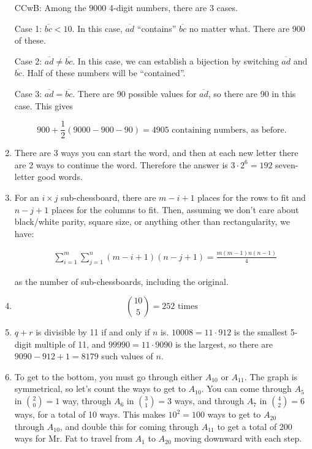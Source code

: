 \documentclass{book}
\numberwithin{equation}{section}
\begin{document}
\begin{enumerate}[label={9.\arabic*}]
CCwB: Among the $9000$ 4-digit numbers, there are 3 cases.

Case 1: $\overline{bc} < 10$. In this case, $\overline{ad}$ ``contains'' $\overline{bc}$ no matter what. There are 900 of these.

Case 2: $\overline{ad} \neq \overline{bc}$. In this case, we can establish a bijection by switching
$\overline{ad}$ and $\overline{bc}$. Half of these numbers will be ``contained''.

Case 3: $\overline{ad} = \overline{bc}$. There are 90 possible values for $\overline{ad}$, so there are 90 in this case. This gives

$$900 + \frac{1}{2}(9000 - 900 - 90) = 4905 \text{ containing numbers, as before.}$$

\item
There are 3 ways you can start the word, and then at each new letter there are 2 ways to continue the word.
Therefore the answer is $3\cdot 2^6 = 192$ seven-letter good words.

\item
For an $i \times j$ sub-chessboard, there are $m-i+1$ places for the rows to fit and $n-j+1$ places for the columns
to fit. Then, assuming we don't care about black/white parity, square size, or anything other than rectangularity,
we have:

\begin{align*}
& \sum_{i=1}^m \sum_{j=1}^n (m-i+1)(n-j+1) = \frac{m(m-1)n(n-1)}{4}
\end{align*}

as the number of sub-chessboards, including the original.

\item
$${10 \choose 5} = 252 \text{ times}$$

\item
$q + r$ is divisible by 11 if and only if $n$ is. $10008 = 11 \cdot 912$ is the smallest 5-digit multiple of 11, and
$99990 = 11 \cdot 9090$ is the largest, so there are $9090 - 912 + 1 = 8179$ such values of $n$.

\item
To get to the bottom, you must go through either $A_{10}$ or $A_{11}$. The graph is symmetrical, so let's
count the ways to get to $A_{10}$. You can come through $A_5$ in ${2 \choose 0} = 1$ way, through $A_6$ in
${3 \choose 1} = 3$ ways, and through $A_7$ in ${4 \choose 2} = 6$ ways, for a total of 10 ways. This makes
$10^2 = 100$ ways to get to $A_{20}$ through $A_{10}$, and double this for coming through $A_{11}$ to get
a total of 200 ways for Mr. Fat to travel from $A_1$ to $A_{20}$ moving downward with each step.


\end{enumerate}
\end{document}
